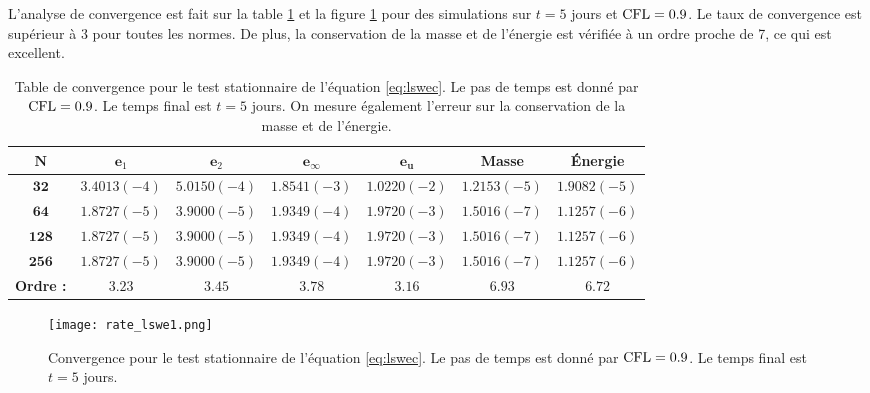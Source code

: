 L'analyse de convergence est fait sur la table \ref{tab:rate_lswe1} et la figure \ref{fig:rate_lswe1} pour des simulations sur $t=5$ jours et $\text{CFL}=0.9$. Le taux de convergence est supérieur à 3 pour toutes les normes. De plus, la conservation de la masse et de l'énergie est vérifiée à un ordre proche de 7, ce qui est excellent.

\begin{table}[htbp]
\begin{center}
\begin{tabular}{|c||c|c|c|c||c|c|}
\hline 
$\mathbf{N}$ & $\mathbf{e}_1$ & $\mathbf{e}_2$ & $\mathbf{e}_{\infty}$ & $\mathbf{e}_{\mathbf{u}}$ & \textbf{Masse} & \textbf{Énergie} \\ 
\hline 
\hline 
$\mathbf{32}$ & $3.4013(-4)$ & $5.0150(-4)$ & $1.8541(-3)$ & $1.0220(-2)$ & $1.2153(-5)$ & $1.9082(-5)$ \\ 

$\mathbf{64}$ & $1.8727(-5)$ & $3.9000(-5)$ & $1.9349(-4)$ & $1.9720(-3)$ & $1.5016(-7)$ & $1.1257(-6)$ \\ 

$\mathbf{128}$& $1.8727(-5)$ & $3.9000(-5)$ & $1.9349(-4)$ & $1.9720(-3)$ & $1.5016(-7)$ & $1.1257(-6)$ \\ 

$\mathbf{256}$& $1.8727(-5)$ & $3.9000(-5)$ & $1.9349(-4)$ & $1.9720(-3)$ & $1.5016(-7)$ & $1.1257(-6)$ \\ 

\hline
\textbf{Ordre :} & $3.23$ & $3.45$ & $3.78$ & $3.16$ & $6.93$ & $6.72$ \\ 
\hline
\end{tabular} 
\end{center}
\caption{Table de convergence pour le test stationnaire de l'équation \eqref{eq:lswec}. Le pas de temps est donné par $\text{CFL}=0.9$. Le temps final est $t=5$ jours. On mesure également l'erreur sur la conservation de la masse et de l'énergie.}
\label{tab:rate_lswe1}
\end{table}

\begin{figure}[htbp]
\begin{center}
\texttt{[image: rate\_lswe1.png]}
\end{center}
\caption{Convergence pour le test stationnaire de l'équation \eqref{eq:lswec}. Le pas de temps est donné par $\text{CFL}=0.9$. Le temps final est $t=5$ jours.}
\label{fig:rate_lswe1}
\end{figure}











